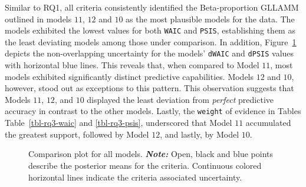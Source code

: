 \documentclass[
  authoryear,
  preprint,
  1p]{elsarticle}
\begin{document}
Similar to RQ1, all criteria consistently identified the Beta-proportion
GLLAMM outlined in models \(11\), \(12\) and \(10\) as the most
plausible models for the data. The models exhibited the lowest values
for both \texttt{WAIC} and \texttt{PSIS}, establishing them as the least
deviating models among those under comparison. In addition,
Figure~\ref{fig-rq3-waic-psis} depicts the non-overlapping uncertainty
for the models' \texttt{dWAIC} and \texttt{dPSIS} values with horizontal
blue lines. This reveals that, when compared to Model \(11\), most
models exhibited significantly distinct predictive capabilities. Models
\(12\) and \(10\), however, stood out as exceptions to this pattern.
This observation suggests that Models \(11\), \(12\), and \(10\)
displayed the least deviation from \emph{perfect} predictive accuracy in
contrast to the other models. Lastly, the \texttt{weight} of evidence in
Tables Table~\ref{tbl-rq3-waic} and \ref{tbl-rq3-psis}, underscored that
Model \(11\) accumulated the greatest support, followed by Model \(12\),
and lastly, by Model \(10\).

\label{cell-fig-rq3-waic-psis}
\begin{figure}[H]


\caption{\label{fig-rq3-waic-psis}Comparison plot for all models.
\textbf{\emph{Note:}} Open, black and blue points describe the posterior
means for the criteria. Continuous colored horizontal lines indicate the
criteria associated uncertainty.}

\end{figure}%
\end{document}
